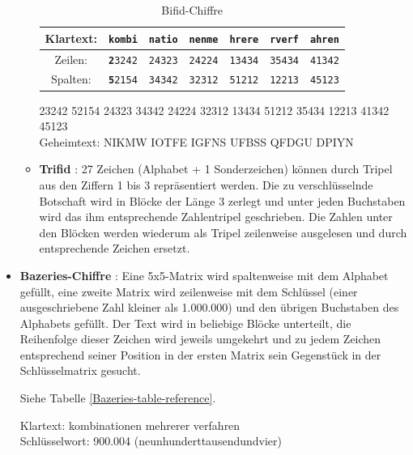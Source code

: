 \begin{refsegment}
\begin{itemize}
\begin{itemize}
\begin{table}[ht]
         \begin{center}
         \begin{tabular}{|c|cccccc|}
         \hline
         Klartext: & {\tt \textbf{k}ombi} & {\tt natio} & {\tt nenme} & {\tt hrere} & {\tt rverf} & {\tt ahren}\\
         \hline
         Zeilen:	& {\tt \textbf{2}3242}	& {\tt 24323} & {\tt 24224} & {\tt 13434} & {\tt 35434} & {\tt 41342}\\
         Spalten: & {\tt \textbf{5}2154} & {\tt 34342} & {\tt 32312} & {\tt 51212} & {\tt 12213} & {\tt 45123}\\
         \hline
         \end{tabular}
         \caption{Bifid-Chiffre}
         \label{Bifid-table-reference}
         \end{center}

         \end{table}

         23242 52154 24323 34342 24224 32312 13434 51212 35434 12213 41342 45123\\

         Geheimtext: NIKMW IOTFE IGFNS UFBSS QFDGU DPIYN\\		


      \item \textbf{Trifid} \cite{Savard1999}:
         27 Zeichen (Alphabet + 1 Sonderzeichen) können durch Tripel aus den
         Ziffern 1 bis 3 repräsentiert werden. Die zu verschlüsselnde
         Botschaft wird in Blöcke der Länge 3 zerlegt und unter jeden
         Buchstaben wird das ihm entsprechende Zahlentripel geschrieben. Die
         Zahlen unter den Blöcken werden wiederum als Tripel zeilenweise
         ausgelesen und durch entsprechende Zeichen ersetzt.
   \end{itemize}


\item \textbf{Bazeries-Chiffre} \cite{ACA2002}:
   Eine 5x5-Matrix wird spaltenweise mit dem Alphabet gefüllt, eine zweite
   Matrix wird zeilenweise mit dem Schlüssel (einer ausgeschriebene Zahl
   kleiner als 1.000.000) und den übrigen Buchstaben des Alphabets gefüllt. Der
   Text wird in beliebige Blöcke unterteilt, die Reihenfolge dieser Zeichen
   wird jeweils umgekehrt und zu jedem Zeichen entsprechend seiner Position
   in der ersten Matrix sein Gegenstück in der Schlüsselmatrix gesucht.

   Siehe Tabelle \ref{Bazeries-table-reference}.

   Klartext: kombinationen mehrerer verfahren\\
   Schlüsselwort: 900.004 (neunhunderttausendundvier)


\end{itemize}
\end{refsegment}
